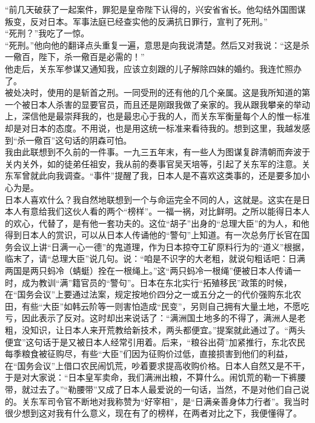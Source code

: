“前几天破获了一起案件，罪犯是皇帝陛下认得的，兴安省省长。他勾结外国图谋叛变，反对日本。军事法庭已经查实他的反满抗日罪行，宣判了死刑。”\\

“死刑？”我吃了一惊。\\

“死刑。”他向他的翻译点头重复一遍，意思是向我说清楚。然后又对我说：“这是杀一儆百，陛下，杀一儆百是必需的！”\\

他走后，关东军参谋又通知我，应该立刻跟的儿子解除四妹的婚约。我连忙照办了。\\

被处决时，使用的是斩首之刑。一同受刑的还有他的几个亲属。这是我所知道的第一个被日本人杀害的显要官员，而且还是刚跟我做了亲家的。我从跟我攀亲的举动上，深信他是最崇拜我的，也是最忠心于我的人，而关东军衡量每个人的惟一标准却是对日本的态度。不用说，也是用这统一标准来看待我的。想到这里，我越发感到“杀一儆百”这句话的阴森可怕。\\

我由此联想到不久前的一件事。一九三五年末，有一些人为图谋复辟清朝而奔波于关内关外，如的徒弟任祖安，我从前的奏事官吴天培等，引起了关东军的注意。关东军曾就此向我调查。“事件”提醒了我，日本人是不喜欢这类事的，还是要多加小心为是。\\

日本人喜欢什么？我自然地联想到一个与命运完全不同的人，这就是。这实在是日本人有意给我们这伙人看的两个“榜样”。一福一祸，对比鲜明。之所以能得日本人的欢心，代替了，是有他一套功夫的。这位“胡子”出身的“总理大臣”的为人，和他得到日本人的赏识，可以从日本人传诵他的“警句”上知道。有一次总务厅长官在国务会议上讲“日满一心一德”的鬼道理，作为日本掠夺工矿原料行为的“道义”根据，临末了，请“总理大臣”说几句。说：“咱是不识字的大老粗，就说句粗话吧：日满两国是两只蚂冷（蜻蜓）拴在一根绳上。”这“两只蚂冷一根绳”便被日本人传诵一时，成为教训“满”籍官员的“警句”。日本在东北实行“拓殖移民”政策的时候，在“国务会议”上要通过法案，规定按地价四分之一或五分之一的代价强购东北农田，有些“大臣”如韩云阶等一则害怕造成“民变”，另则自己拥有大量土地，不愿吃亏，因此表示了反对。这时却出来说话了：“满洲国土地多的不得了，满洲人是老粗，没知识，让日本人来开荒教给新技术，两头都便宜。”提案就此通过了。“两头便宜”这句话于是又被日本人经常引用着。后来，“粮谷出荷”加紧推行，东北农民每季粮食被征购尽，有些“大臣”们因为征购价过低，直接损害到他们的利益，在“国务会议”上借口农民闹饥荒，吵着要求提高收购价格。日本人自然又是不干，于是对大家说：“日本皇军卖命，我们满洲出粮，不算什么。闹饥荒的勒一下裤腰带，就过去了。”“勒腰带”又成了日本人最爱说的一句话，当然，不是对他们自己说的。关东军司令官不断地对我称赞为“好宰相”，是“日满亲善身体力行者”。我当时很少想到这对我有什么意义，现在有了的榜样，在两者对比之下，我便懂得了。\\


